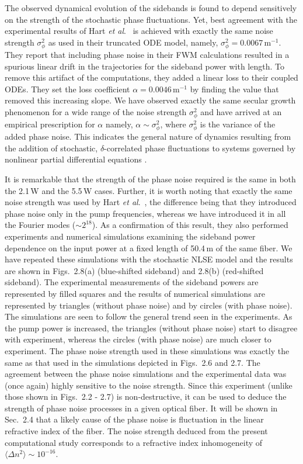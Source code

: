 The observed dynamical evolution of the sidebands is found to depend 
sensitively on the strength of the stochastic phase fluctuations. Yet, best 
agreement with the experimental results of Hart {\it et al}.\ \cite{hart1} is 
achieved with exactly the same noise strength $\sigma^2_\phi$ as used in 
their truncated ODE model, namely, $\sigma^2_\phi = 0.0067$\,m$^{-1}$. They 
report that including phase noise in their FWM calculations resulted in a 
spurious linear drift in the trajectories for the sideband power with length. 
To remove this artifact of the computations, they added a linear loss to their 
coupled ODEs. They set the loss coefficient $\alpha = 0.0046$\,m$^{-1}$ by 
finding the value that removed this increasing slope. We have observed exactly 
the same secular growth phenomenon for a wide range of the noise strength 
$\sigma^2_\phi$ and have arrived at an empirical prescription for $\alpha$ 
namely, $\alpha\sim\sigma^2_\phi$, where $\sigma^2_\phi$ is the 
variance of the added phase noise. This indicates the general nature of 
dynamics resulting from the addition of stochastic, $\delta$-correlated phase 
fluctuations to systems governed by nonlinear partial differential equations 
\cite{risken}. 

It is remarkable that the strength of the phase noise required is the same in 
both the 2.1\,W and the 5.5\,W cases. Further, it is worth noting that exactly 
the same noise strength was used by Hart {\it et al}.\ \cite{hart1}, the difference 
being that they introduced phase noise only in the pump frequencies, whereas 
we have introduced it in all the Fourier modes ($\sim2^{18}$). As a 
confirmation of this result, they also performed experiments and numerical 
simulations examining the sideband power dependence on the input power at a 
fixed length of 50.4\,m of the same fiber. We have repeated these simulations 
with the stochastic NLSE model and the results are shown in Figs.\ 2.8(a) 
(blue-shifted sideband) and 2.8(b) (red-shifted sideband). The experimental 
measurements of the sideband powers are represented by filled squares and the 
results of numerical simulations are represented by triangles (without phase 
noise) and by circles (with phase noise). The simulations are seen to follow 
the general trend seen in the experiments. As the pump power is increased, the 
triangles (without phase noise) start to disagree with experiment, whereas the 
circles (with phase noise) are much closer to experiment. The phase noise 
strength used in these simulations was exactly the same as that used in the 
simulations depicted in Figs.\ 2.6 and 2.7. The agreement between the phase noise 
simulations and the experimental data was (once again) highly sensitive to the 
noise strength. Since this experiment (unlike those shown in Figs.\ 2.2 - 2.7) 
is non-destructive, it can be used to deduce the strength of phase noise 
processes in a given optical fiber. It will be shown in Sec.\ 2.4 that a 
likely cause of the phase noise is fluctuation in the linear refractive index 
of the fiber. The noise strength deduced from the present computational study 
corresponds to a refractive index inhomogeneity of 
$\langle \Delta n^{2} \rangle \sim 10^{-16}$.   


